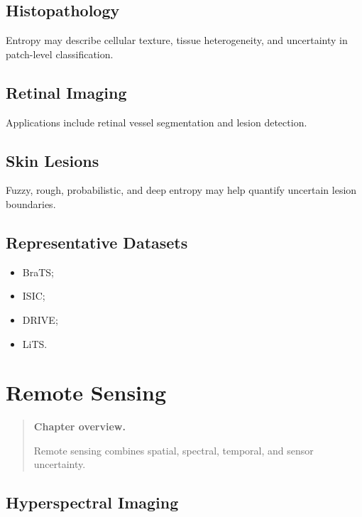 \documentclass[11pt,oneside]{book}
\theoremstyle{remark}
\newenvironment{chapteroverview}
{
	\begin{quote}
		\small
		\textbf{Chapter overview.}
	}
	{
	\end{quote}
}
\newenvironment{datasetlist}
{
	\begin{itemize}[label=\(\triangleright\)]
	}
	{
	\end{itemize}
}
\begin{document}
	\section{Histopathology}
	
	Entropy may describe cellular texture, tissue heterogeneity, and uncertainty in
	patch-level classification.
	
	\section{Retinal Imaging}
	
	Applications include retinal vessel segmentation and lesion detection.
	
	\section{Skin Lesions}
	
	Fuzzy, rough, probabilistic, and deep entropy may help quantify uncertain lesion
	boundaries.
	
	\section*{Representative Datasets}
	
	\begin{datasetlist}
		\item BraTS;
		\item ISIC;
		\item DRIVE;
		\item LiTS.
	\end{datasetlist}
	
	
	\chapter{Remote Sensing}
	\label{chap:remote-sensing}
	
	\begin{chapteroverview}
		Remote sensing combines spatial, spectral, temporal, and sensor uncertainty.
	\end{chapteroverview}
	
	\section{Hyperspectral Imaging}
	
\end{document}
